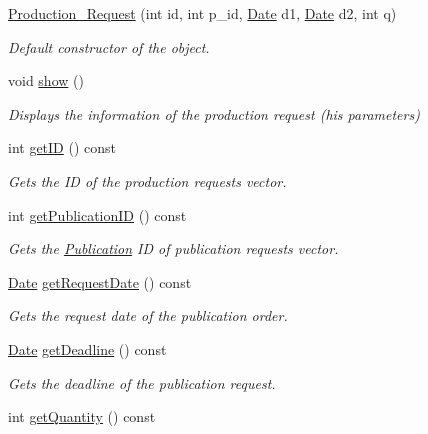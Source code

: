 \begin{DoxyCompactItemize}
\item 
\hyperlink{class_production___request_a0c2c84b7434099e897226a93713dd050}{Production\+\_\+\+Request} (int id, int p\+\_\+id, \hyperlink{class_date}{Date} d1, \hyperlink{class_date}{Date} d2, int q)
\begin{DoxyCompactList}\small\item\em Default constructor of the object. \end{DoxyCompactList}\item 
void \hyperlink{class_production___request_ab08bac86aa95f28f06bf17685f7164aa}{show} ()
\begin{DoxyCompactList}\small\item\em Displays the information of the production request (his parameters) \end{DoxyCompactList}\item 
int \hyperlink{class_production___request_ae2448a51f3bdab909bdc53f2e5bae666}{get\+ID} () const
\begin{DoxyCompactList}\small\item\em Gets the ID of the production requests vector. \end{DoxyCompactList}\item 
int \hyperlink{class_production___request_aafa7c4bbaae9dc72c8954a6e1eaff817}{get\+Publication\+ID} () const
\begin{DoxyCompactList}\small\item\em Gets the \hyperlink{class_publication}{Publication} ID of publication requests vector. \end{DoxyCompactList}\item 
\hyperlink{class_date}{Date} \hyperlink{class_production___request_aed0efd10e677d4bca14d00b5f981718a}{get\+Request\+Date} () const
\begin{DoxyCompactList}\small\item\em Gets the request date of the publication order. \end{DoxyCompactList}\item 
\hyperlink{class_date}{Date} \hyperlink{class_production___request_a3df39092c2aac5a34401f38a29097b3a}{get\+Deadline} () const
\begin{DoxyCompactList}\small\item\em Gets the deadline of the publication request. \end{DoxyCompactList}\item 
int \hyperlink{class_production___request_aac38238db2c32af73c839314c3e254a6}{get\+Quantity} () const

\end{DoxyCompactItemize}
